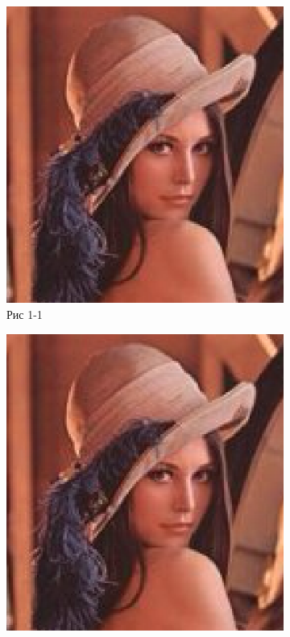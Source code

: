 \begin{figure}[htbp]
    \centering
    \begin{subfigure}[b]{0.3\textwidth}
        \includegraphics[width=\textwidth]{pic/pic} 
        \caption{Рис 1-1}
        \label{fig:sub1}
    \end{subfigure}
    \hfill 
    \begin{subfigure}[b]{0.3\textwidth}
        \includegraphics[width=\textwidth]{pic/pic} 

\end{subfigure}
\end{figure}
